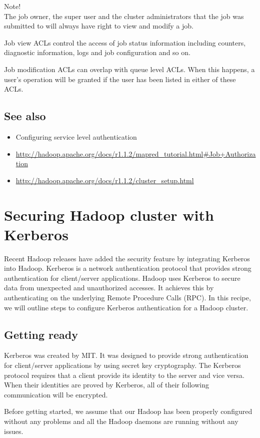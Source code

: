 \begin{info}
Note! \\
The job owner, the super user and the cluster administrators that the job was submitted to will always have right to view and modify a job.
\end{info}

Job view ACLs control the access of job status information including counters, diagnostic information, logs and job configuration and so on.

Job modification ACLs can overlap with queue level ACLs. When this happens, a user's operation will be granted if the user has been listed in either of these ACLs.
\subsection*{See also}
\begin{itemize}
  \item Configuring service level authentication
  \item \url{http://hadoop.apache.org/docs/r1.1.2/mapred_tutorial.html#Job+Authorization}
  \item \url{http://hadoop.apache.org/docs/r1.1.2/cluster_setup.html}
\end{itemize}

\section{Securing Hadoop cluster with Kerberos}
Recent Hadoop releases have added the security feature by integrating Kerberos into Hadoop. Kerberos is a network authentication protocol that provides strong authentication for client/server applications. Hadoop uses Kerberos to secure data from unexpected and unauthorized accesses. It achieves this by authenticating on the underlying Remote Procedure Calls (RPC). In this recipe, we will outline steps to configure Kerberos authentication for a Hadoop cluster.
\subsection*{Getting ready}
Kerberos was created by MIT. It was designed to provide strong authentication for client/server applications by using secret key cryptography. The Kerberos protocol requires that a client provide its identity to the server and vice versa. When their identities are proved by Kerberos, all of their following communication will be encrypted.

Before getting started, we assume that our Hadoop has been properly configured without any problems and all the Hadoop daemons are running without any issues.

